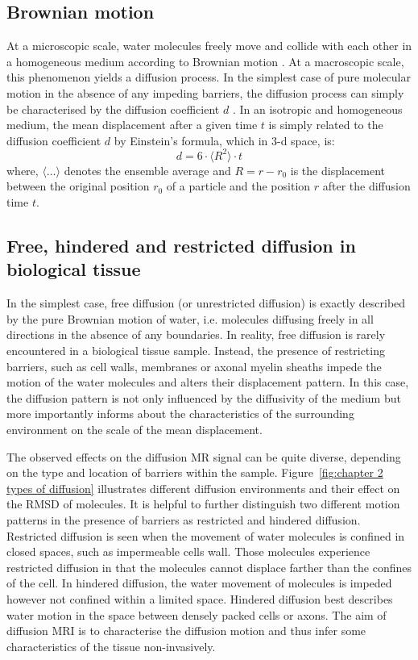 \subsection{Brownian motion}
At a microscopic scale, water molecules freely move and collide with each other in a homogeneous medium according to Brownian motion \citep{Brown:1828}. At a macroscopic scale, this phenomenon yields a diffusion process. In the simplest case of pure molecular motion in the absence of any impeding barriers, the diffusion process can simply be characterised by the diffusion coefficient $d$ \citep{Fick:1855}. In an isotropic and homogeneous medium, the mean displacement after a given time $t$ is simply related to the diffusion coefficient $d$ by Einstein's formula, which in 3-d space, is: 
\begin{equation}
	 d = 6 \cdot \langle R^2 \rangle \cdot t
	\label{eq:chapter2 einsteins formula}
\end{equation}
where, $\langle\dots\rangle$ denotes the ensemble average and $R = r - r_0$ is the displacement between the original position $r_0$ of a particle and the position $r$ after the diffusion time $t$. 

\subsection[Types of diffusion]{Free, hindered and restricted diffusion in biological tissue}
In the simplest case, free diffusion (or unrestricted diffusion) is exactly described by the pure Brownian motion of water, i.e. molecules diffusing freely in all directions in the absence of any boundaries. In reality, free diffusion is rarely encountered in a biological tissue sample. Instead, the presence of restricting barriers, such as cell walls, membranes or axonal myelin sheaths impede the motion of the water molecules and alters their displacement pattern. In this case, the diffusion pattern is not only influenced by the diffusivity of the medium but more importantly informs about the characteristics of the surrounding environment on the scale of the mean displacement. 

The observed effects on the diffusion MR signal can be quite diverse, depending on the type and location of barriers within the sample. Figure~\ref{fig:chapter 2 types of diffusion} illustrates different diffusion environments and their effect on the \gls{RMSD} of molecules. It is helpful to further distinguish two different motion patterns in the presence of barriers as restricted and hindered diffusion.  Restricted diffusion is seen when the movement of water molecules is confined in closed spaces, such as impermeable cells wall. Those molecules experience restricted diffusion in that the molecules cannot displace farther than the confines of the cell. In hindered diffusion, the water movement of molecules is impeded however not confined within a limited space. Hindered diffusion best describes water motion in the space between densely packed cells or axons. The aim of diffusion MRI is to characterise the diffusion motion and thus infer some characteristics of the tissue non-invasively.


